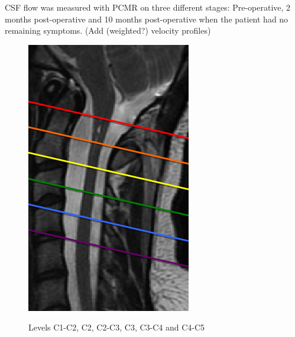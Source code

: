 CSF flow was measured with PCMR on three different stages: Pre-operative, 2 months post-operative and 10 months post-operative when the patient had no remaining symptoms. (Add (weighted?) velocity profiles)
 


\begin{figure}[!ht]
\begin{center}
\includegraphics[scale=0.6]{figures/Syrinx_Levels} \\
\caption{Levels C1-C2, C2, C2-C3, C3, C3-C4 and C4-C5}
\end{center}
\end{figure}
